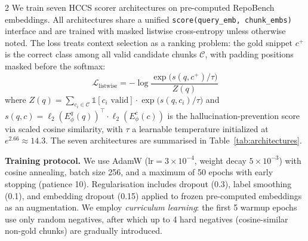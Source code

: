\documentclass[11pt,a4paper]{article}
\begin{document}
\begin{multicols}{2}
We train seven HCCS scorer architectures on pre-computed RepoBench embeddings. All architectures share a unified \texttt{score(query\_emb, chunk\_embs)} interface and are trained with masked listwise cross-entropy unless otherwise noted. The loss treats context selection as a ranking problem: the gold snippet $c^+$ is the correct class among all valid candidate chunks $\mathcal{C}$, with padding positions masked before the softmax:
\begin{equation}\label{eq:listwise}
\mathcal{L}_{\text{listwise}} = -\log \frac{\exp\!\big(s(q, c^+) / \tau\big)}{Z(q)}
\end{equation}
where $Z(q) = \sum_{c_i \in \mathcal{C}} \mathbb{1}[c_i \text{ valid}] \cdot \exp\!\big(s(q, c_i) / \tau\big)$
and $s(q, c) = \ell_2(E_{\phi}^{q}(q))^\top \cdot \ell_2(E_{\phi}^{c}(c))$
is the hallucination-prevention score via scaled cosine similarity, with $\tau$ a learnable temperature initialized at $e^{2.66} \approx 14.3$. The seven architectures are summarised in Table~\ref{tab:architectures}.

\begin{center}
\label{tab:architectures}
\end{center}

\noindent\textbf{Training protocol.} We use AdamW ($\text{lr}=3\times10^{-4}$, weight decay $5\times10^{-3}$) with cosine annealing, batch size 256, and a maximum of 50 epochs with early stopping (patience 10). Regularisation includes dropout (0.3), label smoothing (0.1), and embedding dropout (0.15) applied to frozen pre-computed embeddings as an augmentation. We employ \textit{curriculum learning}: the first 5 warmup epochs use only random negatives, after which up to 4 hard negatives (cosine-similar non-gold chunks) are gradually introduced.


\end{multicols}
\end{document}
